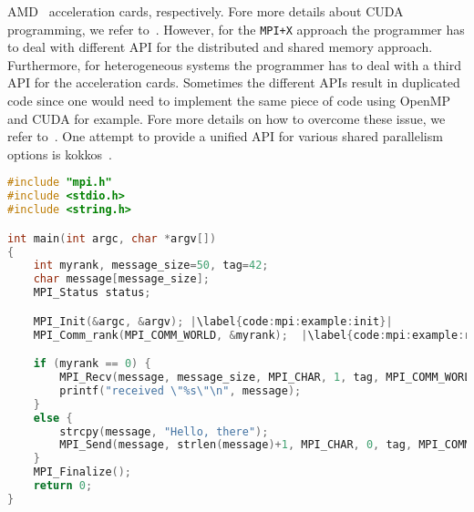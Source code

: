 AMD\texttrademark~ acceleration cards, respectively. Fore more details about CUDA\texttrademark{}~ programming, we refer to~\cite{sanders2010cuda}. However, for the \texttt{MPI+X} approach the programmer has to deal with different API for the distributed and shared memory approach. Furthermore, for heterogeneous systems the programmer has to deal with a third API for the acceleration cards. Sometimes the different APIs result in duplicated code since one would need to implement the same piece of code using OpenMP and CUDA for example. Fore more details on how to overcome these issue, we refer to~\cite{7543422}. One attempt to provide a unified API for various shared parallelism options is kokkos~\cite{10.1016/j.jpdc.2014.07.003}.


\begin{lstlisting}[language=c++,caption={Small Message Passing Interface example to send and receive messages.\label{code:mpi:example}},float,floatplacement=tb,escapechar=|]
#include "mpi.h"
#include <stdio.h>
#include <string.h>

int main(int argc, char *argv[])
{
    int myrank, message_size=50, tag=42;
    char message[message_size];
    MPI_Status status;

    MPI_Init(&argc, &argv); |\label{code:mpi:example:init}|
    MPI_Comm_rank(MPI_COMM_WORLD, &myrank);  |\label{code:mpi:example:rank}|

    if (myrank == 0) { 
        MPI_Recv(message, message_size, MPI_CHAR, 1, tag, MPI_COMM_WORLD, &status); |\label{code:mpi:example:receive}|
        printf("received \"%s\"\n", message);
    }
    else {
        strcpy(message, "Hello, there");
        MPI_Send(message, strlen(message)+1, MPI_CHAR, 0, tag, MPI_COMM_WORLD); |\label{code:mpi:example:send}|
    }
    MPI_Finalize();
    return 0;
}
\end{lstlisting}









\newpage
\theendnotes